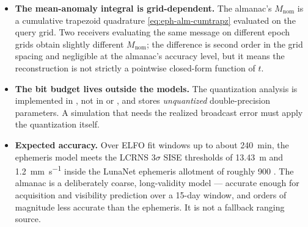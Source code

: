 \begin{itemize}[leftmargin=1.4em]
    and is exactly two-body-consistent with the reconstructed elements in the
    almanac case.
  \item \textbf{The mean-anomaly integral is grid-dependent.} The almanac's
    $M_\mathrm{nom}$ is a cumulative trapezoid quadrature
    \cref{eq:eph-alm-cumtrapz} evaluated on the query grid. Two receivers
    evaluating the same message on different epoch grids obtain slightly
    different $M_\mathrm{nom}$; the difference is second order in the grid
    spacing and negligible at the almanac's accuracy level, but it means the
    reconstruction is not strictly a pointwise closed-form function of $t$.
  \item \textbf{The bit budget lives outside the models.} The
    quantization analysis is implemented in , not in
     or , and  stores
    \emph{unquantized} double-precision parameters. A simulation that needs
    the realized broadcast error must apply the quantization itself.
  \item \textbf{Expected accuracy.} Over ELFO fit windows up to about
    \SI{240}{\minute}, the ephemeris model meets the LCRNS $3\sigma$ SISE
    thresholds of \SI{13.43}{\meter} and
    \SI{1.2}{\milli\meter\per\second} inside the LunaNet ephemeris allotment
    of roughly \SI{900}{\bit} \citep{lunanet2022,iiyama2025ephemeris}. The
    almanac is a deliberately coarse, long-validity model --- accurate enough
    for acquisition and visibility prediction over a 15-day window, and orders
    of magnitude less accurate than the ephemeris. It is not a fallback
    ranging source.
\end{itemize}
